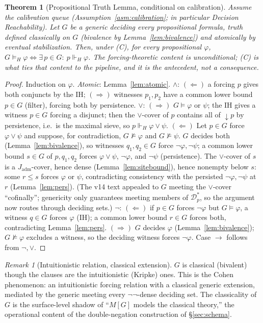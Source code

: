 \documentclass[11pt]{article}
\newtheorem{theorem}{Theorem}
\theoremstyle{definition}
\theoremstyle{remark}
\newtheorem*{remark}{Remark}
\newcommand{\forcesH}{\Vdash_{H}}
\newcommand{\refines}{\leq}
\newcommand{\Jadm}{J_{\mathrm{adm}}}
\begin{document}
\begin{theorem}[Propositional Truth Lemma, conditional on calibration]\label{thm:prop}
Assume the calibration queue (Assumption~\ref{asm:calibration}; in particular Decision
Reachability). Let $G$ be a generic deciding every propositional formula, truth defined classically on
$G$ (bivalence by Lemma~\ref{lem:bivalence}) and atomically by eventual stabilization. Then, under
(C), for every propositional $\varphi$,
$G\models_H\varphi \iff \exists\,p\in G:\ p\forcesH\varphi$.
The forcing-theoretic content is unconditional; (C) is what ties that content to the pipeline, and it
is the antecedent, not a consequence.
\end{theorem}
\begin{proof}
Induction on $\varphi$. \emph{Atomic}: Lemma~\ref{lem:atomic}. \emph{$\wedge$}: $(\Leftarrow)$ a
forcing $p$ gives both conjuncts by the IH; $(\Rightarrow)$ witnesses $p_1,p_2$ have a common lower
bound $p\in G$ (filter), forcing both by persistence. \emph{$\vee$}: $(\Rightarrow)$
$G\models\varphi$ or $\psi$; the IH gives a witness $p\in G$ forcing a disjunct; then the
$\vee$-cover of $p$ contains all of ${\downarrow}p$ by persistence, i.e.\ is the maximal sieve, so
$p\forcesH\varphi\vee\psi$. $(\Leftarrow)$ Let $p\in G$ force $\varphi\vee\psi$ and suppose, for
contradiction, $G\not\models\varphi$ and $G\not\models\psi$. $G$ decides both
(Lemma~\ref{lem:bivalence}), so witnesses $q_1,q_2\in G$ force $\neg\varphi,\neg\psi$; a common
lower bound $s\in G$ of $p,q_1,q_2$ forces $\varphi\vee\psi$, $\neg\varphi$, and $\neg\psi$
(persistence). The $\vee$-cover of $s$ is a $\Jadm$-cover, hence dense
(Lemma~\ref{lem:sitebound}), hence nonempty below $s$: some $r\refines s$ forces $\varphi$ or
$\psi$, contradicting consistency with the persisted $\neg\varphi,\neg\psi$ at $r$
(Lemma~\ref{lem:pers}). (The v14 text appealed to $G$ meeting the $\vee$-cover ``cofinally'';
genericity only guarantees meeting members of $\mathcal{D}_p^\ast$, so the argument now routes
through deciding sets.) \emph{$\neg$}: $(\Leftarrow)$ if $p\in G$ forces $\neg\varphi$ but
$G\models\varphi$, a witness $q\in G$ forces $\varphi$ (IH); a common lower bound $r\in G$ forces both,
contradicting Lemma~\ref{lem:pers}. $(\Rightarrow)$ $G$ decides $\varphi$ (Lemma~\ref{lem:bivalence});
$G\not\models\varphi$ excludes a witness, so the deciding witness forces $\neg\varphi$. Case $\to$
follows from $\neg,\vee$.
\end{proof}

\begin{remark}[Intuitionistic relation, classical extension]
$G$ is classical (bivalent) though the clauses are the intuitionistic (Kripke) ones. This is the
Cohen phenomenon: an intuitionistic forcing relation with a classical generic extension, mediated by
the generic meeting every $\neg\neg$-dense deciding set. The classicality of $G$ is the surface-level
shadow of ``$M[G]$ models the classical theory,'' the operational content of the double-negation
construction of \S\ref{sec:schema}.
\end{remark}
\end{document}
